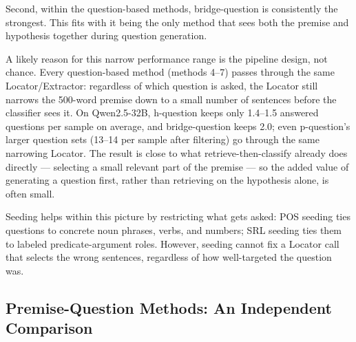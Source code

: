 \documentclass[11pt]{article}
\begin{document}
Second, within the question-based methods, bridge-question is consistently
the strongest. This fits with it being the only method that sees both the
premise and hypothesis together during question generation.

A likely reason for this narrow performance range is the pipeline design, not
chance. Every question-based method (methods 4--7) passes through the same
Locator/Extractor: regardless of which question is asked, the Locator still
narrows the 500-word premise down to a small number of sentences before the
classifier sees it. On Qwen2.5-32B, h-question keeps only 1.4--1.5 answered
questions per sample on average, and bridge-question keeps 2.0; even
p-question's larger question sets (13--14 per sample after filtering) go
through the same narrowing Locator. The result is close to what
retrieve-then-classify already does directly --- selecting a small relevant
part of the premise --- so the added value of generating a question first,
rather than retrieving on the hypothesis alone, is often small.

Seeding helps within this picture by restricting what gets asked: POS
seeding ties questions to concrete noun phrases, verbs, and numbers; SRL
seeding ties them to labeled predicate-argument roles. However, seeding
cannot fix a Locator call that selects the wrong sentences, regardless of
how well-targeted the question was.

\subsection{Premise-Question Methods: An Independent Comparison}
\end{document}
